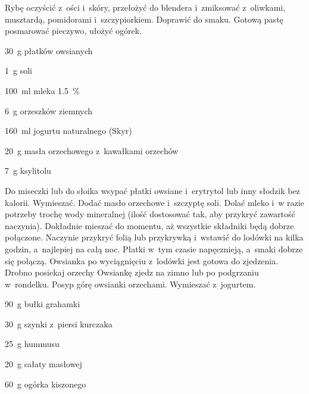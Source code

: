 \documentclass[../main.tex]{subfiles}
\begin{document}
Rybę oczyścić z~ości i~skóry, przełożyć do blendera i~zmiksować z~oliwkami,
musztardą, pomidorami i~szczypiorkiem. Doprawić do smaku. Gotową pastę
posmarować pieczywo, ułożyć ogórek.


\begin{Ingred}
    \item \qty{30}{\gram} płatków owsianych
    \item \qty{1}{\gram} soli
    \item \qty{100}{\milli\litre} mleka \qty{1.5}{\percent}
    \item \qty{6}{\gram} orzeszków ziemnych
    \item \qty{160}{\milli\litre} jogurtu naturalnego (Skyr)
    \item \qty{20}{\gram} masła orzechowego z~kawałkami orzechów
    \item \qty{7}{\gram} ksylitolu
\end{Ingred}

Do miseczki lub do słoika wsypać płatki owsiane i~erytrytol lub inny słodzik
bez kalorii. Wymieszać. Dodać masło orzechowe i~szczyptę soli. Dolać mleko i~w
razie potrzeby trochę wody mineralnej (ilość dostosować tak, aby przykryć
zawartość naczynia). Dokładnie mieszać do momentu, aż wszystkie składniki będą
dobrze połączone. Naczynie przykryć folią lub przykrywką i~wstawić do lodówki
na kilka godzin, a~najlepiej na całą noc. Płatki w~tym czasie napęcznieją,
a~smaki dobrze się połączą. Owsianka po wyciągnięciu z~lodówki jest gotowa do
zjedzenia. Drobno posiekaj orzechy Owsiankę zjedz na zimno lub po podgrzaniu
w~rondelku. Posyp górę owsianki orzechami. Wymieszać z~jogurtem.


\begin{Ingred}
    \item \qty{90}{\gram} bułki grahamki
    \item \qty{30}{\gram} szynki z~piersi kurczaka
    \item \qty{25}{\gram} hummusu
    \item \qty{20}{\gram} sałaty masłowej
    \item \qty{60}{\gram} ogórka kiszonego
\end{Ingred}

\end{document}
